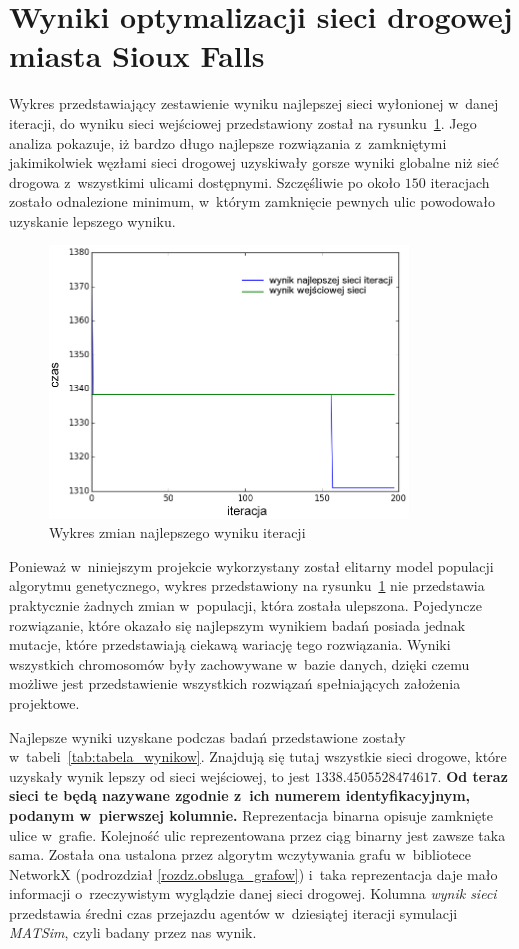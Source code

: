 \documentclass[twoside,12pt]{report}
\begin{document}
\section{Wyniki optymalizacji sieci drogowej miasta Sioux Falls}
Wykres przedstawiający zestawienie wyniku najlepszej sieci wyłonionej w~danej iteracji, do wyniku sieci wejściowej przedstawiony został na rysunku~\ref{fig:wynik_globalny}. Jego analiza pokazuje, iż bardzo długo najlepsze rozwiązania z~zamkniętymi jakimikolwiek węzłami sieci drogowej uzyskiwały gorsze wyniki globalne niż sieć drogowa z~wszystkimi ulicami dostępnymi. Szczęśliwie po około $150$ iteracjach zostało odnalezione minimum, w~którym zamknięcie pewnych ulic powodowało uzyskanie lepszego wyniku.

\begin{figure}[htbp]
	\centering
	\includegraphics[width=0.85\textwidth]{img/fitness}
	\caption{Wykres zmian najlepszego wyniku iteracji}
	\label{fig:wynik_globalny}
\end{figure}

Ponieważ w~niniejszym projekcie wykorzystany został elitarny model populacji algorytmu genetycznego, wykres przedstawiony na rysunku~\ref{fig:wynik_globalny} nie przedstawia praktycznie żadnych zmian w~populacji, która została ulepszona. Pojedyncze rozwiązanie, które okazało się najlepszym wynikiem badań posiada jednak  mutacje, które przedstawiają ciekawą wariację tego rozwiązania. Wyniki wszystkich chromosomów były  zachowywane w~bazie danych, dzięki czemu możliwe jest przedstawienie wszystkich rozwiązań spełniających założenia projektowe.

Najlepsze wyniki uzyskane podczas badań przedstawione zostały w~tabeli~\ref{tab:tabela_wynikow}. Znajdują się tutaj wszystkie sieci drogowe, które uzyskały wynik lepszy od sieci wejściowej, to jest $1338.4505528474617$. \textbf{Od teraz sieci te będą nazywane zgodnie z~ich numerem identyfikacyjnym, podanym w~pierwszej kolumnie.} Reprezentacja binarna opisuje zamknięte ulice w~grafie. Kolejność ulic reprezentowana przez ciąg binarny jest zawsze taka sama. Została ona ustalona przez algorytm wczytywania grafu w~bibliotece NetworkX (podrozdział \ref{rozdz.obsluga_grafow}) i~taka reprezentacja daje mało informacji o~rzeczywistym wyglądzie danej sieci drogowej. Kolumna \textit{wynik sieci} przedstawia średni czas przejazdu agentów w~dziesiątej iteracji symulacji \textit{MATSim}, czyli badany przez nas wynik.
\end{document}
